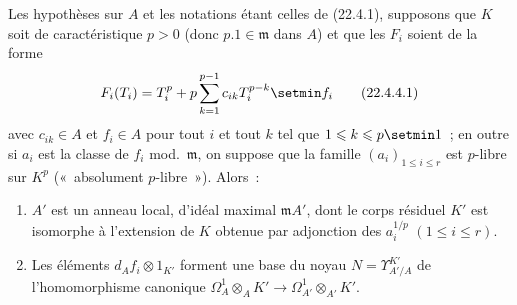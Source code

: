 \begin{proposition}[22.4.4]
\label{0.22.4.4-fr}
Les hypothèses sur $A$ et les notations étant celles de \textup{(22.4.1)}, supposons
que $K$ soit de caractéristique $p>0$ (donc $p.1\in\mathfrak m$ dans
$A$) et que les $F_i$ soient de la forme
\begin{equation}
\label{0.22.4.4.1-fr}
  F_i(T_i)=T_i^p+p\sum_{k=1}^{p-1}c_{ik}T_i^{p-k}\setmin f_i
  \tag{22.4.4.1}
\end{equation}
avec $c_{ik}\in A$ et $f_i\in A$ pour tout $i$ et tout $k$ tel que
$1\leqslant k\leqslant p\setmin 1$~; en outre si $a_i$ est la classe de $f_i$
\textup{mod.}~$\mathfrak m$, on suppose que la famille $(a_i)_{1\leqslant i\leqslant r}$
est $p$-libre sur $K^p$ \textup{(«~absolument $p$-libre~»)}. Alors~:
\begin{enumerate}
  \item[\textup{(i)}] $A'$ est un anneau local, d'idéal maximal $\mathfrak mA'$,
  dont le corps résiduel $K'$ est isomorphe à l'extension de $K$ obtenue par
  adjonction des $a_i^{1/p}$ $(1\leqslant i\leqslant r)$.


  \item[\textup{(ii)}] Les éléments $d_Af_i\otimes1_{K'}$ forment une base du noyau
  $N=\Upsilon^{K'}_{A'/A}$ de l'homomorphisme canonique
  $\Omega^1_A\otimes_AK'\longrightarrow\Omega^1_{A'}\otimes_{A'}K'$.
\end{enumerate}
\end{proposition}

